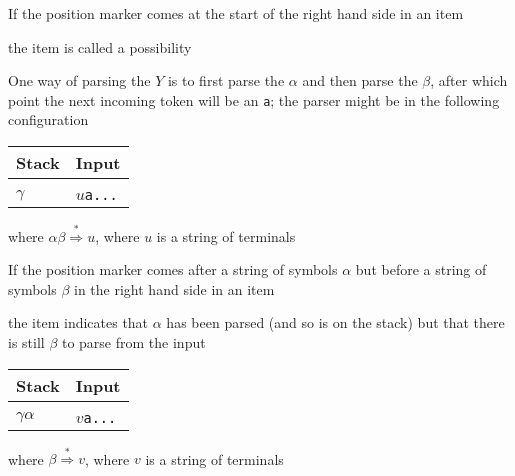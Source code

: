 \documentclass[8pt,a4paper,compress,handout]{beamer}
\newcommand{\mm}[1]{$#1$}
\newcommand{\derives}{\stackrel{*}{\Rightarrow}}
\newenvironment{spaced}
{
\smallskip
\hspace{.5cm}
\begin{minipage}[c]{\textwidth}
}
{
\end{minipage}
\smallskip
}
\begin{document}
\begin{frame}[fragile]
\pause

If the position marker comes at the start of the right hand side in an item

\text{ }
\begin{spaced}
\begin{production}
[Y ::= \mm{\cdot \alpha \beta}, \lstinline{a}]
\end{production}
\end{spaced}

\noindent the item is called a possibility

\pause
\bigskip

One way of parsing the $Y$ is to first parse the $\alpha$ and then parse the $\beta$, after which point the next incoming token will be an \lstinline{a}; the parser might be in the following configuration

\begin{table}[H]
\begin{tabular}{ll}
Stack & Input \\ \hline \\
$\gamma$ & $u$\lstinline$a...$
\end{tabular}
\end{table}

\noindent where $\alpha \beta \derives u$, where $u$ is a string of terminals
\end{frame}

\begin{frame}[fragile]
\pause

If the position marker comes after a string of symbols $\alpha$ but before a string of symbols $\beta$ in the right hand side in an item

\text{ }
\begin{spaced}
\begin{production}
[Y ::= \mm{\alpha \cdot \beta}, \lstinline{a}]
\end{production}
\end{spaced}

\noindent the item indicates that $\alpha$ has been parsed (and so is on the stack) but that there is still $\beta$ to parse from the input

\begin{table}[H]
\begin{tabular}{ll}
Stack & Input \\ \hline \\
$\gamma \alpha$ & $v$\lstinline$a...$
\end{tabular}
\end{table}

\noindent where $\beta \derives v$, where $v$ is a string of terminals
\end{frame}
\end{document}
